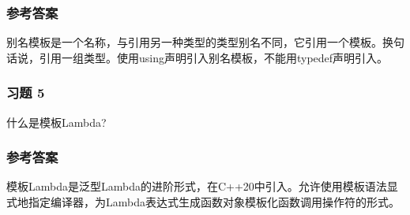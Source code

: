 \subsubsection{参考答案}

别名模板是一个名称，与引用另一种类型的类型别名不同，它引用一个模板。换句话说，引用一组类型。使用using声明引入别名模板，不能用typedef声明引入。

\subsubsection{习题 5}

什么是模板Lambda?

\subsubsection{参考答案}

模板Lambda是泛型Lambda的进阶形式，在C++20中引入。允许使用模板语法显式地指定编译器，为Lambda表达式生成函数对象模板化函数调用操作符的形式。












